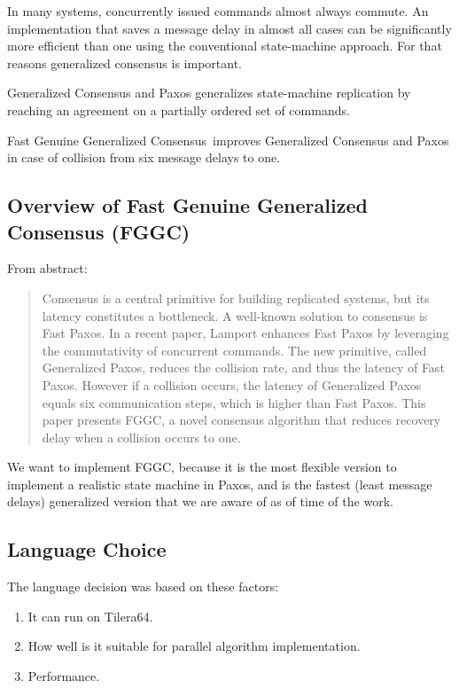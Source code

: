 \documentclass[english,11pt]{l4proj}
\newcommand{\fggc}{Fast Genuine Generalized Consensus}
\begin{document}
In many systems, concurrently issued commands almost always commute. An
implementation that saves a message delay in almost all cases can be
significantly more efficient than one using the conventional state-machine
approach\cite{generalized-consensus}. For that reasons generalized consensus is
important.

Generalized Consensus and Paxos generalizes state-machine replication by
reaching an agreement on a partially ordered set of commands.

\fggc\ improves Generalized Consensus and Paxos in case of collision from six
message delays to one.

\subsection{Overview of Fast Genuine Generalized Consensus (FGGC)}

From abstract\cite{fggc}:

\begin{quote}
Consensus is a central primitive for building replicated systems, but its
latency constitutes a bottleneck. A well-known solution to consensus is Fast
Paxos. In a recent paper, Lamport enhances Fast Paxos by leveraging the
commutativity of concurrent commands. The new primitive, called Generalized
Paxos, reduces the collision rate, and thus the latency of Fast Paxos. However
if a collision occurs, the latency of Generalized Paxos equals six communication
steps, which is higher than Fast Paxos. This paper presents FGGC, a novel
consensus algorithm that reduces recovery delay when a collision occurs to
one.
\end{quote}

We want to implement FGGC, because it is the most flexible version to implement
a realistic state machine in Paxos, and is the fastest (least message delays)
generalized version that we are aware of as of time of the work.

\subsection{Language Choice}
\label{sec:erlang-why}

The language decision was based on these factors:
\begin{enumerate}
    \item It can run on Tilera64.
    \item How well is it suitable for parallel algorithm implementation.
    \item Performance.
\end{enumerate}
\end{document}
